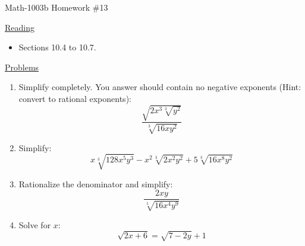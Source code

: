 \documentclass[letterpaper,12pt,fleqn]{article}
\begin{document}
\begin{center}
\Large Math-1003b Homework \#13
\end{center}

\vspace{0.5in}

\underline{Reading}

\bigskip

\begin{itemize}
\item Sections 10.4 to 10.7.
\end{itemize}

\bigskip

\underline{Problems}

\bigskip

\begin{enumerate}
\item Simplify completely. You answer should contain no negative exponents (Hint:
  convert to rational exponents):
  \[\frac{\sqrt{2x^3\sqrt[3]{y^2}}}{\sqrt[3]{16xy^2}}\]
  
\item Simplify:
  \[x\sqrt[3]{128x^5y^3}-x^2\sqrt[3]{2x^2y^2}+5\sqrt[3]{16x^8y^2}\]

\item Rationalize the denominator and simplify:
  \[\frac{2xy}{\sqrt[5]{16x^4y^9}}\]
  
\item Solve for $x$:
  \[\sqrt{2x+6}=\sqrt{7-2y}+1\]
\end{enumerate}
\end{document}
